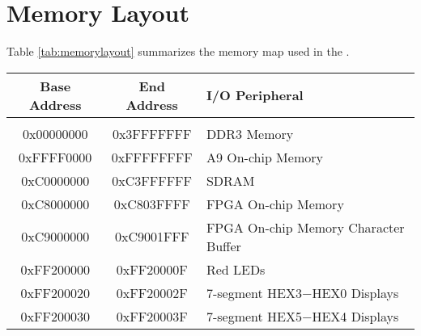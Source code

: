 

\clearpage
\section{Memory Layout}
\label{sec:mm}

\noindent
Table \ref{tab:memorylayout} summarizes the memory map used in the \systemNameFull.
~\\

\begin{table}[h]
    \begin{center}
    \begin{tabular}{c|c|l}
            \textbf{Base Address}
            & \textbf{End Address}
            & \textbf{I/O Peripheral}
				\\\hline\vspace{-3mm}\\
            0x00000000
            & 0x3FFFFFFF
            & DDR3 Memory
        \\
            0xFFFF0000
            & 0xFFFFFFFF
            & A9 On-chip Memory
        \\
            0xC0000000
            & 0xC3FFFFFF
            & SDRAM
        \\
            0xC8000000
            & 0xC803FFFF
            & FPGA On-chip Memory
        \\
            0xC9000000
            & 0xC9001FFF
            & FPGA On-chip Memory Character Buffer
        \\
            0xFF200000
            & 0xFF20000F
            & Red LEDs
        \\
            0xFF200020
            & 0xFF20002F
            & 7-segment HEX3$-$HEX0 Displays
        \\
            0xFF200030
            & 0xFF20003F
            & 7-segment HEX5$-$HEX4 Displays


\end{tabular}
\end{center}
\end{table}
